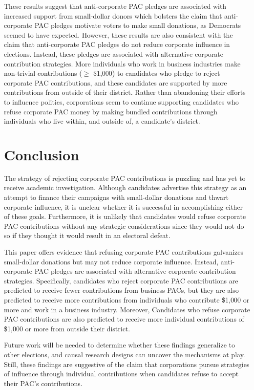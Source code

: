 \documentclass[12pt]{article}
\begin{document}
These results suggest that anti-corporate PAC pledges are associated with increased support from small-dollar donors which bolsters the claim that anti-corporate PAC pledges motivate voters to make small donations, as Democrats seemed to have expected. However, these results are also consistent with the claim that anti-corporate PAC pledges do not reduce corporate influence in elections. Instead, these pledges are associated with alternative corporate contribution strategies. More individuals who work in business industries make non-trivial contributions ($\geq$ \$1,000) to candidates who pledge to reject corporate PAC contributions, and these candidates are supported by more contributions from outside of their district. Rather than abandoning their efforts to influence politics, corporations seem to continue supporting candidates who refuse corporate PAC money by making bundled contributions through individuals who live within, and outside of, a candidate's district.


\section{Conclusion} \label{sec: conclusion}

The strategy of rejecting corporate PAC contributions is puzzling and has yet to receive academic investigation. Although candidates advertise this strategy as an attempt to finance their campaigns with small-dollar donations and thwart corporate influence, it is unclear whether it is successful in accomplishing either of these goals. Furthermore, it is unlikely that candidates would refuse corporate PAC contributions without any strategic considerations since they would not do so if they thought it would result in an electoral defeat. 

This paper offers evidence that refusing corporate PAC contributions galvanizes small-dollar donations but may not reduce corporate influence. Instead, anti-corporate PAC pledges are associated with alternative corporate contribution strategies. Specifically, candidates who reject corporate PAC contributions are predicted to receive fewer contributions from business PACs, but they are also predicted to receive more contributions from individuals who contribute \$1,000 or more and work in a business industry. Moreover, Candidates who refuse corporate PAC contributions are also predicted to receive more individual contributions of \$1,000 or more from outside their district.   

Future work will be needed to determine whether these findings generalize to other elections, and causal research designs can uncover the mechanisms at play. Still, these findings are suggestive of the claim that corporations pursue strategies of influence through individual contributions when candidates refuse to accept their PAC's contributions. 
\end{document}
